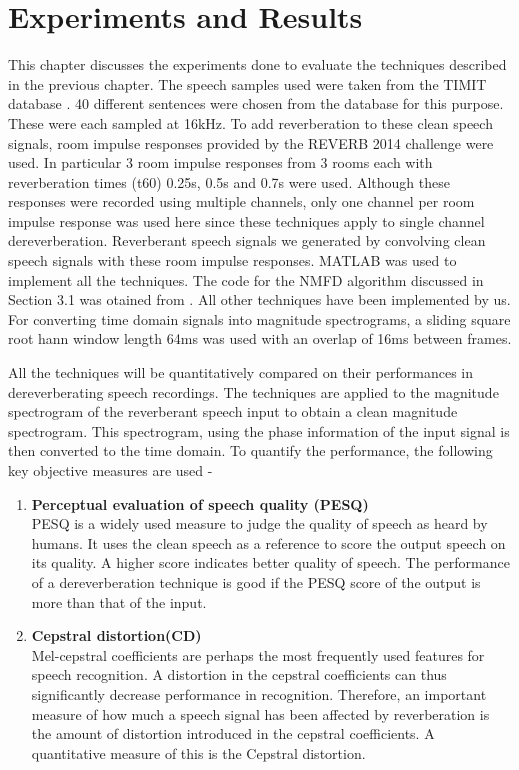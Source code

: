 \chapter{Experiments and Results}

\ifpdf
    \graphicspath{{Chapter3/Figs/Raster/}{Chapter3/Figs/PDF/}{Chapter3/Figs/}}
\else
    \graphicspath{{Chapter3/Figs/Vector/}{Chapter3/Figs/}}
\fi
This chapter discusses the experiments done to evaluate the techniques described in the previous chapter. The speech samples used were taken from the TIMIT database \cite{TIMIT}. 40 different sentences were chosen from the database for this purpose. These were each sampled at 16kHz. To add reverberation to these clean speech signals, room impulse responses provided by the REVERB 2014 challenge were used. In particular 3 room impulse responses from 3 rooms each with reverberation times (t60) 0.25s, 0.5s and 0.7s were used. Although these responses were recorded using multiple channels, only one channel per room impulse response was used here since these techniques apply to single channel dereverberation.   Reverberant speech signals we generated by convolving clean speech signals with these room impulse responses. MATLAB was used to implement all the techniques. The code for the NMFD algorithm discussed in Section 3.1 was otained from \cite{gamma}. All other techniques have been implemented by us. 
For converting time domain signals into magnitude spectrograms, a sliding square root hann window \cite{moham} length 64ms  was used with an overlap of 16ms between frames.

All the techniques will be quantitatively compared on their performances in dereverberating speech recordings. The techniques are applied to the magnitude spectrogram of the reverberant speech input to obtain a clean magnitude spectrogram. This spectrogram, using the phase information of the input signal is then converted to the time domain. 
To quantify the performance, the following key objective measures are used - 
\begin{enumerate}
\item \textbf{Perceptual evaluation of speech quality (PESQ)} \\
PESQ is a widely used measure to judge the quality of speech as heard by humans. It uses the clean speech as a reference to score the output speech on its quality. A higher score indicates better quality of speech. The performance of a dereverberation technique is good if the PESQ score of the output is more than that of the input.
\item \textbf{Cepstral distortion(CD)} \\
Mel-cepstral coefficients are perhaps the most frequently used features for speech recognition. A distortion in the cepstral coefficients can thus significantly decrease performance in recognition. Therefore, an important measure of how much a speech signal has been affected by reverberation is the amount of distortion introduced in the cepstral coefficients. A quantitative measure of this is the Cepstral distortion. 

\end{enumerate}


